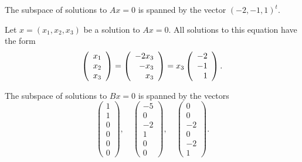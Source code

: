 \documentclass{ximera}
\begin{document}
\ans The subspace of solutions to $Ax = 0$ is spanned by the vector
$(-2,-1,1)^t$.

\soln Let $x = (x_1,x_2,x_3)$ be a solution to $Ax = 0$.  All solutions
to this equation have the form
\[
\left(\begin{array}{r} x_1 \\ x_2 \\ x_3\end{array}\right) = \left(\begin{array}{r} -2x_3 \\ -x_3 \\ x_3\end{array}\right) =
x_3\left(\begin{array}{r} -2 \\ -1 \\ 1\end{array}\right).
\]

\ans The subspace of solutions to $Bx = 0$ is spanned by the vectors
\[
\left(\begin{array}{r} 1 \\ 1 \\ 0 \\ 0 \\ 0 \\ 0 \end{array}\right), \quad
\left(\begin{array}{r} -5 \\ 0 \\ -2 \\ 1 \\ 0 \\ 0 \end{array}\right), \quad
\left(\begin{array}{r} 0 \\ 0 \\ -2 \\ 0 \\ -2 \\ 1 \end{array}\right).
\]
\end{document}
